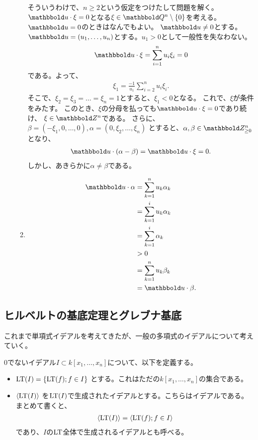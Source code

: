 \documentclass[9pt]{ltjsarticle}
\newcommand{\bbold}{\mathbbold}
\begin{document}
\begin{enumerate}[label=(問題\arabic*)]
\begin{enumerate}[label=(\alph*)]
   そういうわけで、$n\ge 2$という仮定をつけたして問題を解く。$\bbold u\cdot \xi=0$となる$\xi \in \Q^n\setminus\zeroset$を考える。$\bbold u = 0$のときはなんでもよい。
   $\bbold u \neq 0$とする。$\bbold u = (u_1,\dots, u_n)$とする。$u_1 > 0$として一般性を失なわない。
   \begin{align}
     \bbold u\cdot \xi = \sum_{i=1}^n u_i \xi_i = 0
   \end{align}
   である。よって、
   \begin{align}
     \xi_1 = \frac{-1}{u_1}\sum_{i=2}^n u_i \xi_i.
   \end{align}
   そこで、$\xi_2=\xi_3=\dots = \xi_n = 1$とすると、$\xi_1 < 0$となる。
   これで、$\xi$が条件をみたす。
   このとき、$\xi$の分母を払っても$\bbold u\cdot \xi = 0$であり続け、
   $\xi \in \Z^n$である。
   さらに、$\beta = (-\xi_1,0,\dots,0),\alpha = (0,\xi_2,\dots,\xi_n)$
   とすると、$\alpha,\beta \in \Zge^n$となり、
   \begin{align}
     \bbold u\cdot (\alpha - \beta) = \bbold u\cdot \xi = 0.
   \end{align}
   しかし、あきらかに$\alpha \neq \beta$である。
   \item
   \begin{align}
     \bbold u \cdot \alpha
     &=
     \sum_{k=1}^n u_k \alpha_k\\
     &=
     \sum_{k=1}^i u_k \alpha_k\\
     &=
     \sum_{k=1}^i \alpha_k\\
     &>
     0\\
     &=
     \sum_{k=1}^n u_k \beta_k\\
     &=
     \bbold u\cdot \beta.
   \end{align}

 \end{enumerate}
\end{enumerate}

\subsection{ヒルベルトの基底定理とグレブナ基底}
\label{sub:ヒルベルトの基底定理とグレブナ基底}
これまで単項式イデアルを考えてきたが、一般の多項式のイデアルについて考えていく。

0でないイデアル$I\subset k[x_1,\dots,x_n]$について、以下を定義する。
\begin{itemize}
  \item  ${\rm LT}(I) = \left\{{\rm LT}(f) ; f\in I\right\}$ とする。これはただの$k[x_1,\dots,x_n]$の集合である。
  \item  $\left\langle {\rm LT}(I) \right\rangle$ を${\rm LT}(I)$で生成されたイデアルとする。こちらはイデアルである。まとめて書くと、
  \begin{align}
    \left\langle {\rm LT}(I) \right\rangle = \left\langle {\rm LT}(f) ; f\in I \right\rangle
  \end{align}
  であり、$I$の${\rm LT}$全体で生成されるイデアルとも呼べる。
\end{itemize}
\end{document}
